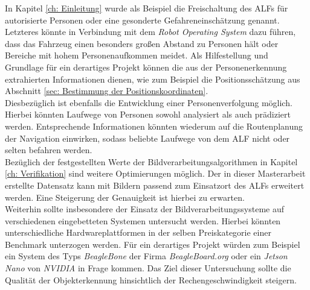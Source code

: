 In Kapitel \ref{ch: Einleitung} wurde als Beispiel die Freischaltung des ALFs für autorisierte Personen oder eine gesonderte Gefahreneinschätzung genannt. Letzteres könnte in Verbindung mit dem \textit{Robot Operating System} dazu führen, dass das Fahrzeug einen besonders großen Abstand zu Personen hält oder Bereiche mit hohem Personenaufkommen meidet. Als Hilfestellung und Grundlage für ein derartiges Projekt können die aus der Personenerkennung extrahierten Informationen dienen, wie zum Beispiel die Positionsschätzung aus Abschnitt \ref{sec: Bestimmung der Positionskoordinaten}. \\

Diesbezüglich ist ebenfalls die Entwicklung einer Personenverfolgung möglich. Hierbei könnten Laufwege von Personen sowohl analysiert als auch prädiziert werden. Entsprechende Informationen könnten wiederum auf die Routenplanung der Navigation einwirken, sodass beliebte Laufwege von dem ALF nicht oder selten befahren werden. \\

Bezüglich der festgestellten Werte der Bildverarbeitungsalgorithmen in Kapitel \ref{ch: Verifikation} sind weitere Optimierungen möglich. Der in dieser Masterarbeit erstellte Datensatz kann mit Bildern passend zum Einsatzort des ALFs erweitert werden. Eine Steigerung der Genauigkeit ist hierbei zu erwarten.\\

Weiterhin sollte insbesondere der Einsatz der Bildverarbeitungssysteme auf verschiedenen eingebetteten Systemen untersucht werden. Hierbei könnten unterschiedliche Hardwareplattformen in der selben Preiskategorie einer Benchmark unterzogen werden. Für ein derartiges Projekt würden zum Beispiel ein System des Typs \textit{BeagleBone} der Firma \textit{BeagleBoard.org} oder ein \textit{Jetson Nano} von \textit{NVIDIA} in Frage kommen. Das Ziel dieser Untersuchung sollte die Qualität der Objekterkennung hinsichtlich der Rechengeschwindigkeit steigern. 





